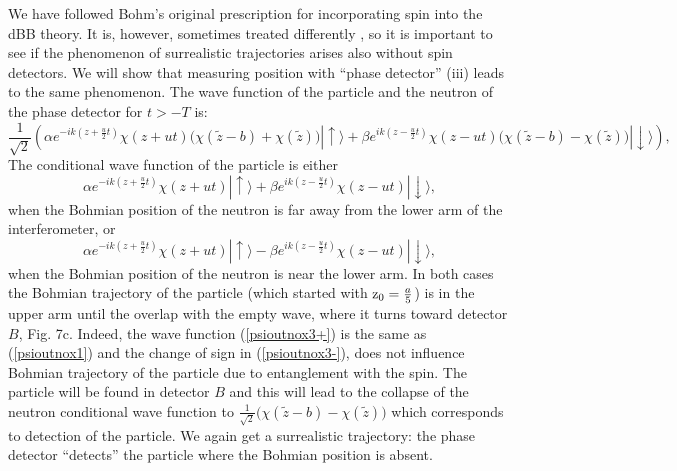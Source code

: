 \documentclass[preprint,tightenlines]{elsarticle}
\begin{document}
We have followed Bohm's original prescription for incorporating spin
into the dBB theory. It is, however, sometimes treated differently \cite{DewdneyHKV},
 so it is important to see if the phenomenon of surrealistic trajectories
arises also without spin detectors. We will show that measuring position
with ``phase detector'' (iii) leads to the same phenomenon. The
wave function of the particle and the neutron of the phase detector
for $t>-T$ is:
 \begin{equation}
\frac{1}{\sqrt{2}}\left(\alpha e^{-ik(z+\frac{u}{2}t)}\chi(z+ut)\Big(\chi(\tilde{z}-b)+\chi(\tilde{z})\Big )|\uparrow\rangle+\beta e^{ik(z-\frac{u}{2}t)}\chi(z-ut)\Big(\chi(\tilde{z}-b)-\chi(\tilde{z})\Big )|\downarrow\rangle\right),\label{psioutnox3}
\end{equation}
 The conditional wave function of the particle is either
  \begin{equation}
\alpha e^{-ik(z+\frac{u}{2}t)}\chi(z+ut)|\uparrow\rangle+\beta e^{ik(z-\frac{u}{2}t)}\chi(z-ut)|\downarrow\rangle,\label{psioutnox3+}
\end{equation}
 when the Bohmian position of the neutron is far away from the lower arm of the interferometer, or
  \begin{equation}
\alpha e^{-ik(z+\frac{u}{2}t)}\chi(z+ut)|\uparrow\rangle-\beta e^{ik(z-\frac{u}{2}t)}\chi(z-ut)|\downarrow\rangle,\label{psioutnox3-}
\end{equation}
 when the Bohmian position of the neutron is near the lower arm. In both cases
the Bohmian trajectory of the particle (which started with ${\rm z_{0}}=\frac{a}{5}$)
is in the upper arm  until the overlap with the empty wave, where it turns
toward detector $B$, Fig. 7c. Indeed, the wave function (\ref{psioutnox3+})
is the same as (\ref{psioutnox1}) and the change of sign in (\ref{psioutnox3-}),
does not influence Bohmian trajectory of the particle due to entanglement
with the spin. The particle will be found in detector $B$ and this
will lead to the collapse of the neutron conditional
wave function  to $ \frac{1}{\sqrt{2}}\Big(\chi(\tilde{z}-b)-\chi(\tilde{z})\Big)$
which corresponds to detection of the particle. We again get a surrealistic
trajectory: the phase detector ``detects'' the particle where
the Bohmian position is absent.
\end{document}
